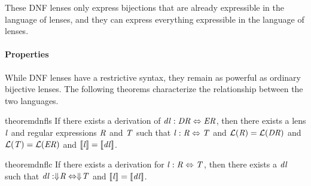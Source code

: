 \documentclass[numbers,10pt,preprint\ifanon ,nocopyrightspace\fi]{sigplanconf}
\begin{document}
\iffull
These DNF lenses only express bijections that are already expressible in the
language of lenses, and they can express everything expressible in the
language of lenses.
\fi

\paragraph*{Properties}  While DNF lenses have a restrictive syntax, they
remain as powerful as ordinary bijective lenses.  The following theorems
characterize the relationship between the two languages.

\begin{restatable}{theorem}{dnfls}
  \label{thm:dnfls}
  If there exists a derivation of $\mathit{dl} : \mathit{DR} \Leftrightarrow \mathit{ER}$,
  then there exists a lens $\mathit{l}$ and regular expressions $\mathit{R}$ and 
$\mathit{T}$ such that $\mathit{l} : \mathit{R} \Leftrightarrow \mathit{T}$ and
  $\mathcal{L}(\mathit{R})=\mathcal{L}(\mathit{DR})$ and
  $\mathcal{L}(\mathit{T})=\mathcal{L}(\mathit{ER})$ and
  $[ \! [\mathit{l}] \! ]=[ \! [\mathit{dl}] \! ]$.
\end{restatable}

\begin{restatable}{theorem}{dnflc}
  \label{thm:dnflc}
  If there exists a derivation for $\mathit{l} : \mathit{R} \Leftrightarrow
  \mathit{T}$,
  then there exists a $\mathit{dl}$ such that
  $\mathit{dl} : \Downarrow\mkern-4mu \mathit{R} \Leftrightarrow \Downarrow\mkern-4mu \mathit{T}$ and $[ \! [\mathit{l}] \! ]=[ \! [\mathit{dl}] \! ]$.
\end{restatable}
\end{document}
